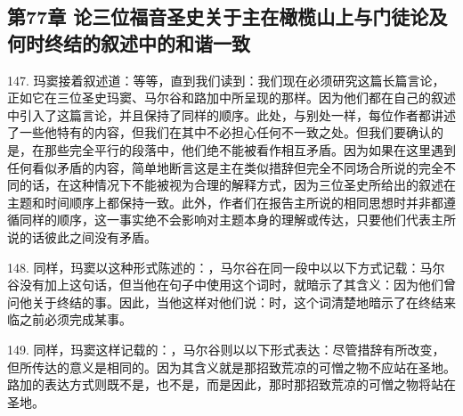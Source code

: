 \subsection{第77章 论三位福音圣史关于主在橄榄山上与门徒论及何时终结的叙述中的和谐一致}

147. 玛窦接着叙述道：等等，直到我们读到：我们现在必须研究这篇长篇言论，正如它在三位圣史玛窦、马尔谷和路加中所呈现的那样。因为他们都在自己的叙述中引入了这篇言论，并且保持了同样的顺序。此处，与别处一样，每位作者都讲述了一些他特有的内容，但我们在其中不必担心任何不一致之处。但我们要确认的是，在那些完全平行的段落中，他们绝不能被看作相互矛盾。因为如果在这里遇到任何看似矛盾的内容，简单地断言这是主在类似措辞但完全不同场合所说的完全不同的话，在这种情况下不能被视为合理的解释方式，因为三位圣史所给出的叙述在主题和时间顺序上都保持一致。此外，作者们在报告主所说的相同思想时并非都遵循同样的顺序，这一事实绝不会影响对主题本身的理解或传达，只要他们代表主所说的话彼此之间没有矛盾。\par

148. 同样，玛窦以这种形式陈述的：，马尔谷在同一段中以以下方式记载：马尔谷没有加上这句话，但当他在句子中使用这个词时，就暗示了其含义：因为他们曾问他关于终结的事。因此，当他这样对他们说：时，这个词清楚地暗示了在终结来临之前必须完成某事。\par

149. 同样，玛窦这样记载的：，马尔谷则以以下形式表达：尽管措辞有所改变，但所传达的意义是相同的。因为其含义就是那招致荒凉的可憎之物不应站在圣地。路加的表达方式则既不是，也不是，而是因此，那时那招致荒凉的可憎之物将站在圣地。\par


